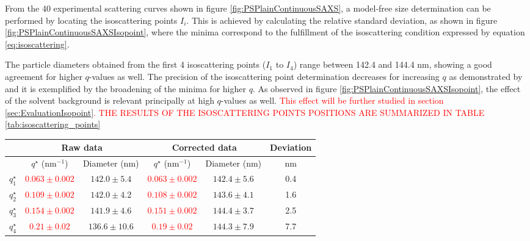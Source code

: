 From the 40 experimental scattering curves shown in figure \ref{fig:PSPlainContinuousSAXS}, a model-free size determination can be performed by locating the isoscattering points $I_i$. This is achieved by calculating the relative standard deviation, as shown in figure \ref{fig:PSPlainContinuousSAXSIsopoint}, where the minima correspond to the fulfillment of the isoscattering condition expressed by equation \ref{eq:isoscattering}.

The particle diameters obtained from the first 4 isoscattering points ($I_1$ to $I_4$) range between 142.4 and 144.4 nm, showing a good agreement for higher $q$-values as well. The precision of the isoscattering point determination decreases for increasing $q$ as demonstrated by \cite{kawaguchi_isoscattering_1992} and it is exemplified by the broadening of the minima for higher $q$. As observed in figure \ref{fig:PSPlainContinuousSAXSIsopoint}, the effect of the solvent background is relevant principally at high $q$-values as well. \textcolor{red}{This effect will be further studied in section \ref{sec:EvaluationIsopoint}. THE RESULTS OF THE ISOSCATTERING POINTS POSITIONS ARE SUMMARIZED IN TABLE \ref{tab:isoscattering_points}}


\begin{table*}
\centering
\begin{tabular}{l||cc|cc|c}
& \multicolumn{2}{c}{Raw data} & \multicolumn{2}{c}{Corrected data} & Deviation\\
\hline
& \( q^{\star} \) (nm\(^{-1}\))    &  Diameter (nm) & \( q^{\star}\) (nm\(^{-1}\))    &  Diameter (nm) & nm \\
\hline
\(q^{\star}_1\) &  \textcolor{red}{$0.063\pm0.002$} & $142.0\pm5.4$ &  \textcolor{red}{$0.063\pm0.002$} & $142.4\pm5.6$ & 0.4 \\
\(q^{\star}_2\) &  \textcolor{red}{$0.109\pm0.002$} & $142.0\pm4.2$ &  \textcolor{red}{$0.108\pm0.002$} & $143.6\pm4.1$ & 1.6   \\
\(q^{\star}_3\) &  \textcolor{red}{$0.154\pm0.002$} & $141.9\pm4.6$ &  \textcolor{red}{$0.151\pm0.002$} & $144.4\pm3.7$ & 2.5    \\
\(q^{\star}_4\) &  \textcolor{red}{$0.21\pm0.02$}  & $136.6\pm10.6$ &  \textcolor{red}{$0.19\pm0.02$}  & $144.3\pm7.9$ & 7.7     \\
\end{tabular}
\caption[Isoscattering points position and their corresponding particle diameter.]{Isoscattering points position and the corresponding particle diameter for the scattering curves before and after background correction. The diameter deviation between both values is also shown, with larger deviation for higher $q$-values. \textcolor{red}{The associated uncertainty is calculated as described in CHAPTER 4, where the major contribution arises from the diffuseness of $q^{\star}$ due to the deviations from the non-ideality of the particles.}}
\label{tab:isoscattering_points}
\end{table*}



